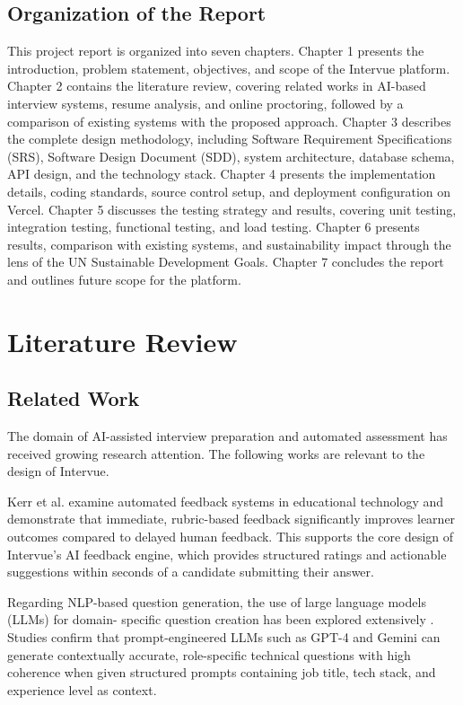 \section{Organization of the Report}
This project report is organized into seven chapters. Chapter 1 presents the introduction,
problem statement, objectives, and scope of the Intervue platform. Chapter 2 contains the
literature review, covering related works in AI-based interview systems, resume analysis, and
online proctoring, followed by a comparison of existing systems with the proposed approach.
Chapter 3 describes the complete design methodology, including Software Requirement
Specifications (SRS), Software Design Document (SDD), system architecture, database schema,
API design, and the technology stack. Chapter 4 presents the implementation details, coding
standards, source control setup, and deployment configuration on Vercel. Chapter 5 discusses
the testing strategy and results, covering unit testing, integration testing, functional testing,
and load testing. Chapter 6 presents results, comparison with existing systems, and sustainability
impact through the lens of the UN Sustainable Development Goals. Chapter 7 concludes the report
and outlines future scope for the platform.

\chapter{Literature Review}

\section{Related Work}
The domain of AI-assisted interview preparation and automated assessment has received growing
research attention. The following works are relevant to the design of Intervue.

Kerr et al. \cite{book1} examine automated feedback systems in educational technology and
demonstrate that immediate, rubric-based feedback significantly improves learner outcomes
compared to delayed human feedback. This supports the core design of Intervue's AI feedback
engine, which provides structured ratings and actionable suggestions within seconds of a
candidate submitting their answer.

Regarding NLP-based question generation, the use of large language models (LLMs) for domain-
specific question creation has been explored extensively \cite{article1}. Studies confirm
that prompt-engineered LLMs such as GPT-4 and Gemini can generate contextually accurate,
role-specific technical questions with high coherence when given structured prompts containing
job title, tech stack, and experience level as context.

